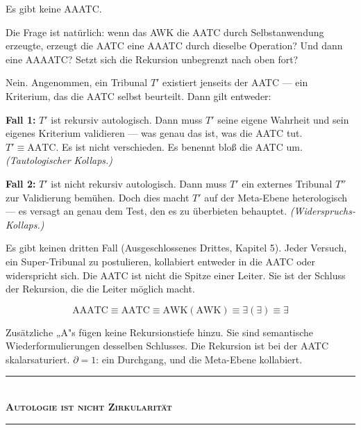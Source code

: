 \documentclass[10pt, openany, oneside]{book}
\renewcommand{\normalsize}{\fontsize{10}{13}\selectfont}
\begin{document}
\vspace{1em}

\noindent Es gibt keine AAATC.

Die Frage ist natürlich: wenn das AWK die AATC durch Selbstanwendung erzeugte, erzeugt die AATC eine AAATC durch dieselbe Operation? Und dann eine AAAATC? Setzt sich die Rekursion unbegrenzt nach oben fort?

Nein. Angenommen, ein Tribunal $T'$ existiert jenseits der AATC --- ein Kriterium, das die AATC selbst beurteilt. Dann gilt entweder:

\textbf{Fall 1:} $T'$ ist rekursiv autologisch. Dann muss $T'$ seine eigene Wahrheit und sein eigenes Kriterium validieren --- was genau das ist, was die AATC tut. $T' \equiv \text{AATC}$. Es ist nicht verschieden. Es benennt bloß die AATC um. \textit{(Tautologischer Kollaps.)}

\textbf{Fall 2:} $T'$ ist nicht rekursiv autologisch. Dann muss $T'$ ein externes Tribunal $T''$ zur Validierung bemühen. Doch dies macht $T'$ auf der Meta-Ebene heterologisch --- es versagt an genau dem Test, den es zu überbieten behauptet. \textit{(Widerspruchs-Kollaps.)}

Es gibt keinen dritten Fall (Ausgeschlossenes Drittes, Kapitel 5). Jeder Versuch, ein Super-Tribunal zu postulieren, kollabiert entweder in die AATC oder widerspricht sich. Die AATC ist nicht die Spitze einer Leiter. Sie ist der Schluss der Rekursion, die die Leiter möglich macht.

$$\text{AAATC} \equiv \text{AATC} \equiv \text{AWK}(\text{AWK}) \equiv \exists(\exists) \equiv \exists$$

Zusätzliche „A"s fügen keine Rekursionstiefe hinzu. Sie sind semantische Wiederformulierungen desselben Schlusses. Die Rekursion ist bei der AATC skalarsaturiert. $\partial = 1$: ein Durchgang, und die Meta-Ebene kollabiert.

\vspace{1.5em}


\begin{center}
    \rule{0.3\textwidth}{0.4pt}\\[0.5em]
    {\normalsize\bfseries\scshape Autologie ist nicht Zirkularität}\\[0.3em]
    \rule{0.3\textwidth}{0.4pt}
\end{center}
\end{document}
